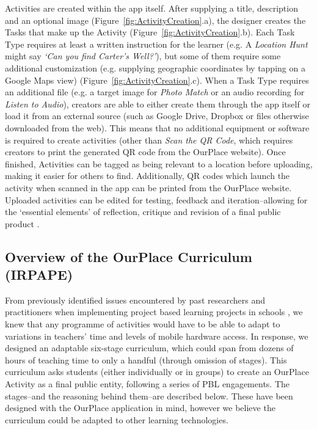 \documentclass[,hyphens]{sigchi}
\begin{document}
Activities are created within the app itself. After supplying a title, description and an optional image (Figure~\ref{fig:ActivityCreation}.a), the designer creates the Tasks that make up the Activity (Figure~\ref{fig:ActivityCreation}.b). Each Task Type requires at least a written instruction for the learner (e.g. A \textit{Location Hunt} might say \textit{`Can you find Carter's Well?'}), but some of them require some additional customization (e.g. supplying geographic coordinates by tapping on a Google Maps view) (Figure~\ref{fig:ActivityCreation}.c). When a Task Type requires an additional file (e.g. a target image for \textit{Photo Match} or an audio recording for \textit{Listen to Audio}), creators are able to either create them through the app itself or load it from an external source (such as Google Drive, Dropbox or files otherwise downloaded from the web). This means that no additional equipment or software is required to create activities (other than \textit{Scan the QR Code}, which requires creators to print the generated QR code from the OurPlace website). Once finished, Activities can be tagged as being relevant to a location before uploading, making it easier for others to find. Additionally, QR codes which launch the activity when scanned in the app can be printed from the OurPlace website. Uploaded activities can be edited for testing, feedback and iteration--allowing for the `essential elements' of reflection, critique and revision of a final public product \cite{Larmer2015}. 


\subsection{Overview of the OurPlace Curriculum (IRPAPE)}

From previously identified issues encountered by past researchers and practitioners when implementing project based learning projects in schools \cite{Blumenfeld1991, Krajcik2006, InnovationUnit2016, TheEducationEndowmentFoundation2016}, we knew that any programme of activities would have to be able to adapt to variations in teachers' time and levels of mobile hardware access. In response, we designed an adaptable six-stage curriculum, which could span from dozens of hours of teaching time to only a handful (through omission of stages). This curriculum asks students (either individually or in groups) to create an OurPlace Activity as a final public entity, following a series of PBL engagements. The stages--and the reasoning behind them--are described below. These have been designed with the OurPlace application in mind, however we believe the curriculum could be adapted to other learning technologies.
\end{document}
